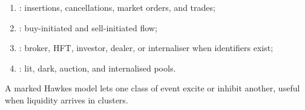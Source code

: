 \begin{taxonomy} 
\begin{enumerate}[label=\roman*.]
\setlength{\itemsep}{0pt}
\item {}: insertions, cancellations, market orders, and trades;
\item {}: buy-initiated and sell-initiated flow;
\item {}: broker, HFT, investor, dealer, or internaliser when identifiers exist;
\item {}: lit, dark, auction, and internalised pools.
\end{enumerate}
A marked Hawkes model lets one class of event excite or inhibit another, useful when liquidity arrives in clusters.
\end{taxonomy}
